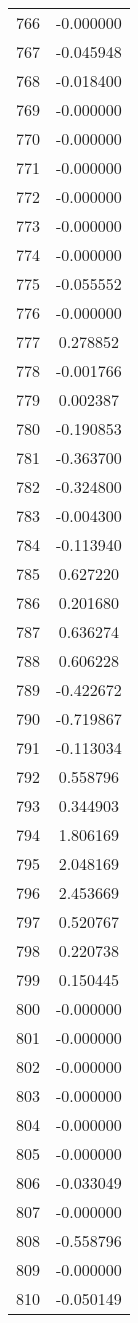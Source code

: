 \documentclass[12pt]{article}
\begin{document}
\begin{longtable}{@{}cc@{}}
766 & -0.000000 \\
767 & -0.045948 \\
768 & -0.018400 \\
769 & -0.000000 \\
770 & -0.000000 \\
771 & -0.000000 \\
772 & -0.000000 \\
773 & -0.000000 \\
774 & -0.000000 \\
775 & -0.055552 \\
776 & -0.000000 \\
777 & 0.278852 \\
778 & -0.001766 \\
779 & 0.002387 \\
780 & -0.190853 \\
781 & -0.363700 \\
782 & -0.324800 \\
783 & -0.004300 \\
784 & -0.113940 \\
785 & 0.627220 \\
786 & 0.201680 \\
787 & 0.636274 \\
788 & 0.606228 \\
789 & -0.422672 \\
790 & -0.719867 \\
791 & -0.113034 \\
792 & 0.558796 \\
793 & 0.344903 \\
794 & 1.806169 \\
795 & 2.048169 \\
796 & 2.453669 \\
797 & 0.520767 \\
798 & 0.220738 \\
799 & 0.150445 \\
800 & -0.000000 \\
801 & -0.000000 \\
802 & -0.000000 \\
803 & -0.000000 \\
804 & -0.000000 \\
805 & -0.000000 \\
806 & -0.033049 \\
807 & -0.000000 \\
808 & -0.558796 \\
809 & -0.000000 \\
810 & -0.050149 \\

\end{longtable}
\end{document}
